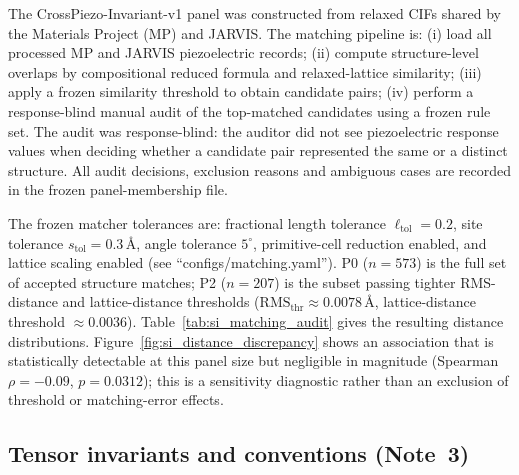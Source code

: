 \documentclass[11pt]{article}
\begin{document}
The CrossPiezo-Invariant-v1 panel was constructed from relaxed CIFs shared by the Materials Project (MP) and JARVIS.
The matching pipeline is: (i) load all processed MP and JARVIS piezoelectric records; (ii) compute structure-level overlaps by compositional reduced formula and relaxed-lattice similarity; (iii) apply a frozen similarity threshold to obtain candidate pairs; (iv) perform a response-blind manual audit of the top-matched candidates using a frozen rule set.
The audit was response-blind: the auditor did not see piezoelectric response values when deciding whether a candidate pair represented the same or a distinct structure.
All audit decisions, exclusion reasons and ambiguous cases are recorded in the frozen panel-membership file.

The frozen matcher tolerances are: fractional length tolerance $\ell_\mathrm{tol}=0.2$, site tolerance $s_\mathrm{tol}=0.3$\,\AA, angle tolerance $5^\circ$, primitive-cell reduction enabled, and lattice scaling enabled (see ``configs/matching.yaml'').
P0 ($n=573$) is the full set of accepted structure matches; P2 ($n=207$) is the subset passing tighter RMS-distance and lattice-distance thresholds ($\mathrm{RMS}_\mathrm{thr}\approx0.0078$\,\AA, lattice-distance threshold $\approx0.0036$).
Table~\ref{tab:si_matching_audit} gives the resulting distance distributions.
Figure~\ref{fig:si_distance_discrepancy} shows an association that is statistically detectable at this panel size but negligible in magnitude (Spearman $\rho=-0.09$, $p=0.0312$); this is a sensitivity diagnostic rather than an exclusion of threshold or matching-error effects.

\subsection{Tensor invariants and conventions (Note~3)}
\end{document}
